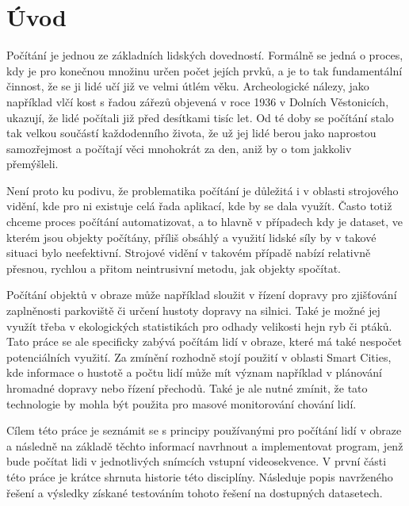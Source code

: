 \chapter{Úvod}
\label{sec:Introduction}
Počítání je jednou ze základních lidských dovedností. Formálně se jedná o proces, kdy je pro konečnou množinu určen počet jejích prvků, a je to tak fundamentální činnost, že se ji lidé učí již ve velmi útlém věku.
Archeologické nálezy, jako například vlčí kost s řadou zářezů objevená v roce 1936 v Dolních Věstonicích, ukazují, že lidé počítali již před desítkami tisíc let.
Od té doby se počítání stalo tak velkou součástí každodenního života, že už jej lidé berou jako naprostou samozřejmost a počítají věci mnohokrát za den, aniž by o tom jakkoliv přemýšleli.

Není proto ku podivu, že problematika počítání je důležitá i v oblasti strojového vidění, kde pro ni existuje celá řada aplikací, kde by se dala využít.
Často totiž chceme proces počítání automatizovat, a to hlavně v případech kdy je dataset, ve kterém jsou objekty počítány, příliš obsáhlý a využití lidské síly by v takové situaci bylo neefektivní.
Strojové vidění v takovém případě nabízí relativně přesnou, rychlou a přitom neintrusivní metodu, jak objekty spočítat.

Počítání objektů v obraze může například sloužit v řízení dopravy pro zjišťování zaplněnosti parkoviště či určení hustoty dopravy na silnici. Také je možné jej využít třeba v ekologických statistikách pro odhady velikosti hejn ryb či ptáků.
Tato práce se ale specificky zabývá počítám lidí v obraze, které má také nespočet potenciálních využití.
Za zmínění rozhodně stojí použití v oblasti Smart Cities, kde informace o hustotě a počtu lidí může mít význam například v plánování hromadné dopravy nebo řízení přechodů.
Také je ale nutné zmínit, že tato technologie by mohla být použita pro masové monitorování chování lidí.

Cílem této práce je seznámit se s principy používanými pro počítání lidí v obraze a následně na základě těchto informací navrhnout a implementovat program, jenž bude počítat lidi v jednotlivých snímcích vstupní videosekvence.
V první části této práce je krátce shrnuta historie této disciplíny. Následuje popis navrženého řešení a  výsledky získané testováním tohoto řešení na dostupných datasetech.


\endinput